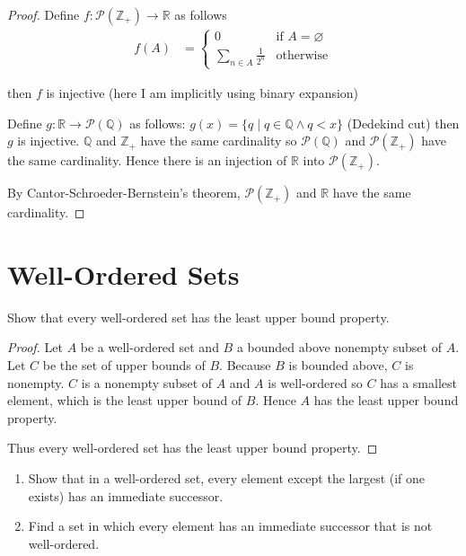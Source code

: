 \begin{proof}
    Define $f: \mathscr{P}(\mathbb{Z}_{+})\to \mathbb{R}$ as follows
    \begin{align*}
        f(A) & = \begin{cases}
                     0                            & \text{if $A = \varnothing$} \\
                     \sum_{n\in A}\frac{1}{2^{n}} & \text{otherwise}
                 \end{cases}
    \end{align*}

    then $f$ is injective (here I am implicitly using binary expansion)

    Define $g: \mathbb{R}\to \mathscr{P}(\mathbb{Q})$ as follows: $g(x) = \{ q \mid q\in\mathbb{Q} \land q < x \}$ (Dedekind cut) then $g$ is injective. $\mathbb{Q}$ and $\mathbb{Z}_{+}$ have the same cardinality so $\mathscr{P}(\mathbb{Q})$ and $\mathscr{P}(\mathbb{Z}_{+})$ have the same cardinality. Hence there is an injection of $\mathbb{R}$ into $\mathscr{P}(\mathbb{Z}_{+})$.

    By Cantor-Schroeder-Bernstein's theorem, $\mathscr{P}(\mathbb{Z}_{+})$ and $\mathbb{R}$ have the same cardinality.
\end{proof}

\section{Well-Ordered Sets}

\begin{exercise}\label{chapter1:section10:exercise1}
    Show that every well-ordered set has the least upper bound property.
\end{exercise}

\begin{proof}
    Let $A$ be a well-ordered set and $B$ a bounded above nonempty subset of $A$. Let $C$ be the set of upper bounds of $B$. Because $B$ is bounded above, $C$ is nonempty. $C$ is a nonempty subset of $A$ and $A$ is well-ordered so $C$ has a smallest element, which is the least upper bound of $B$. Hence $A$ has the least upper bound property.

    Thus every well-ordered set has the least upper bound property.
\end{proof}

\begin{exercise}\label{chapter1:section10:exercise2}
    \begin{enumerate}[label={(\alph*)}]
        \item Show that in a well-ordered set, every element except the largest (if one exists) has an immediate successor.
        \item Find a set in which every element has an immediate successor that is not well-ordered.
    \end{enumerate}
\end{exercise}

